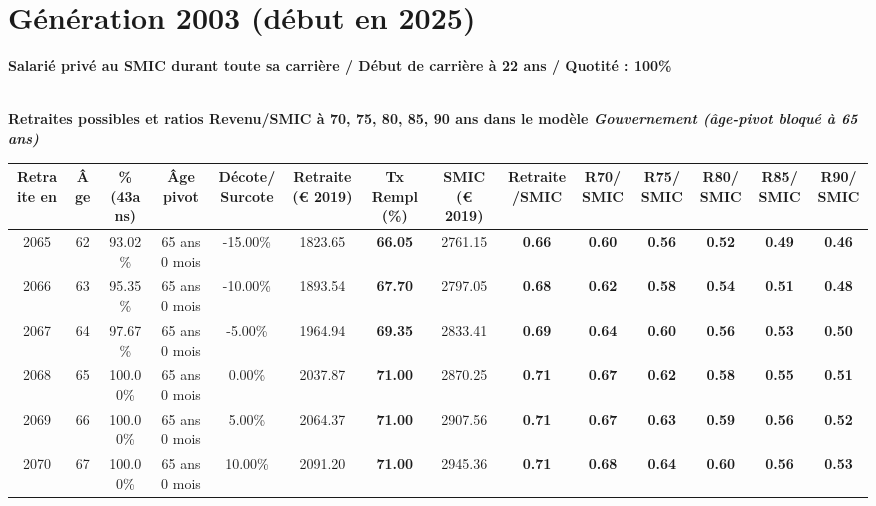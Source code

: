 \newpage 
 
\section{Génération 2003 (début en 2025)\label{SMIC_100_22_2003_0}} 
 
{\bf \noindent Salarié privé au SMIC durant toute sa carrière / Début de carrière à 22 ans / Quotité : 100\%}  ~ 

 ~\\{\bf \noindent Retraites possibles et ratios Revenu/SMIC à 70, 75, 80, 85, 90 ans dans le modèle \emph{Gouvernement (âge-pivot bloqué à 65 ans)}}  
 
\begin{adjustbox}{max width=\textwidth} 
\begin{tabular}[htb]{|c|c||c|c|c||c|c||c|c||c|c|c|c|c|} 
\hline 
 Retraite en &  Âge &  \%(43ans) &  Âge pivot &  Décote/Surcote &  Retraite (\euro{} 2019) &  Tx Rempl(\%) &  SMIC (\euro{} 2019) &  Retraite/SMIC &  R70/SMIC &  R75/SMIC &  R80/SMIC &  R85/SMIC &  R90/SMIC \\ 
\hline \hline 
 2065 &  62 &  93.02\% &  65 ans 0 mois &  -15.00\% &  1823.65 &  {\bf 66.05} &  2761.15 &  {\bf {\color{red} 0.66}} &  {\bf {\color{red} 0.60}} &  {\bf {\color{red} 0.56}} &  {\bf {\color{red} 0.52}} &  {\bf {\color{red} 0.49}} &  {\bf {\color{red} 0.46}} \\ 
\hline 
 2066 &  63 &  95.35\% &  65 ans 0 mois &  -10.00\% &  1893.54 &  {\bf 67.70} &  2797.05 &  {\bf {\color{red} 0.68}} &  {\bf {\color{red} 0.62}} &  {\bf {\color{red} 0.58}} &  {\bf {\color{red} 0.54}} &  {\bf {\color{red} 0.51}} &  {\bf {\color{red} 0.48}} \\ 
\hline 
 2067 &  64 &  97.67\% &  65 ans 0 mois &  -5.00\% &  1964.94 &  {\bf 69.35} &  2833.41 &  {\bf {\color{red} 0.69}} &  {\bf {\color{red} 0.64}} &  {\bf {\color{red} 0.60}} &  {\bf {\color{red} 0.56}} &  {\bf {\color{red} 0.53}} &  {\bf {\color{red} 0.50}} \\ 
\hline 
 2068 &  65 &  100.00\% &  65 ans 0 mois &  0.00\% &  2037.87 &  {\bf 71.00} &  2870.25 &  {\bf {\color{red} 0.71}} &  {\bf {\color{red} 0.67}} &  {\bf {\color{red} 0.62}} &  {\bf {\color{red} 0.58}} &  {\bf {\color{red} 0.55}} &  {\bf {\color{red} 0.51}} \\ 
\hline 
 2069 &  66 &  100.00\% &  65 ans 0 mois &  5.00\% &  2064.37 &  {\bf 71.00} &  2907.56 &  {\bf {\color{red} 0.71}} &  {\bf {\color{red} 0.67}} &  {\bf {\color{red} 0.63}} &  {\bf {\color{red} 0.59}} &  {\bf {\color{red} 0.56}} &  {\bf {\color{red} 0.52}} \\ 
\hline 
 2070 &  67 &  100.00\% &  65 ans 0 mois &  10.00\% &  2091.20 &  {\bf 71.00} &  2945.36 &  {\bf {\color{red} 0.71}} &  {\bf {\color{red} 0.68}} &  {\bf {\color{red} 0.64}} &  {\bf {\color{red} 0.60}} &  {\bf {\color{red} 0.56}} &  {\bf {\color{red} 0.53}} \\ 
\hline 
\hline 
\end{tabular} 
\end{adjustbox} 
 
